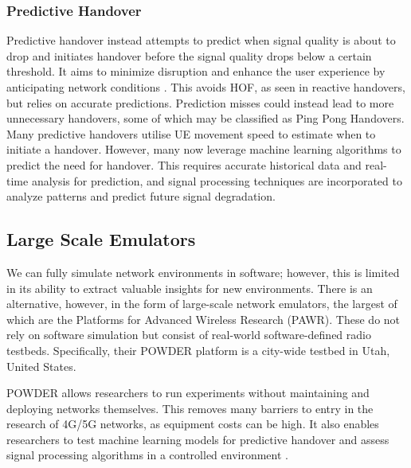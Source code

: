 \subsubsection*{Predictive Handover} Predictive handover instead attempts to predict when signal quality is about to drop and initiates handover before the signal quality drops below a certain threshold. It aims to minimize disruption and enhance the user experience by anticipating network conditions \cite{al-quraan_enhancing_2023}. This avoids HOF, as seen in reactive handovers, but relies on accurate predictions. Prediction misses could instead lead to more unnecessary handovers, some of which may be classified as Ping Pong Handovers. Many predictive handovers utilise UE movement speed to estimate when to initiate a handover. However, many now leverage machine learning algorithms to predict the need for handover. This requires accurate historical data and real-time analysis for prediction, and signal processing techniques are incorporated to analyze patterns and predict future signal degradation.



\subsection{Large Scale Emulators}
We can fully simulate network environments in software; however, this is limited in its ability to extract valuable insights for new environments. There is an alternative, however, in the form of large-scale network emulators, the largest of which are the Platforms for Advanced Wireless Research (PAWR). These do not rely on software simulation but consist of real-world software-defined radio testbeds. Specifically, their POWDER platform is a city-wide testbed in Utah, United States. 

POWDER allows researchers to run experiments without maintaining and deploying networks themselves. This removes many barriers to entry in the research of 4G/5G networks, as equipment costs can be high. It also enables researchers to test machine learning models for predictive handover and assess signal processing algorithms in a controlled environment \cite{rusca_mobile_2023}.

